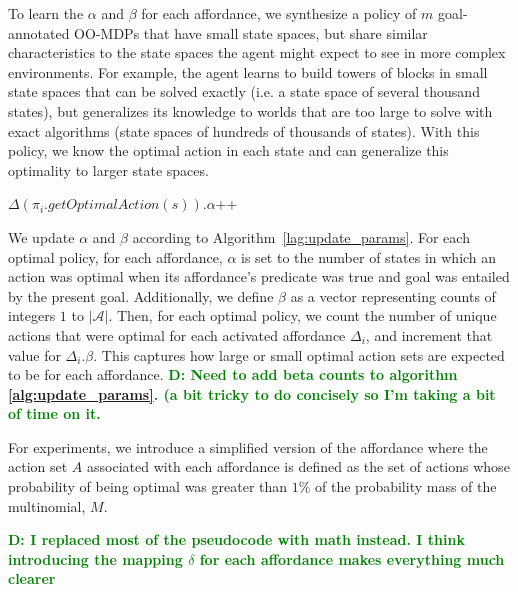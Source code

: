 \documentclass[conference]{IEEEtran}
\newcommand{\dnote}[1]{\textcolor{Green}{\textbf{D: #1}}}
\begin{document}
To learn the $\alpha$ and $\beta$ for each
affordance, we synthesize a policy of $m$ goal-annotated
OO-MDPs that have small state spaces, but share similar characteristics
to the state spaces the agent might expect to see in more
complex environments. For example, the agent learns to build towers
of blocks in small state spaces that can be solved exactly (i.e. a state space of several thousand states), but
generalizes its knowledge to worlds that are too large to
solve with exact algorithms (state spaces of hundreds of thousands of states). With this policy,
we know the optimal action in each state and can generalize this optimality to larger state spaces.

\begin{algorithm}
  \caption{$updateParameters(knowledgeBase, \pi)$}
  \begin{algorithmic}[1]
    \State $\Delta(\pi_i.getOptimalAction(s)).\alpha$++
    \EndIf
    \EndFor
    \EndFor
  \end{algorithmic}
  \label{alg:update_params}
\end{algorithm}

We update $\alpha$ and $\beta$ according to Algorithm~\ref{lag:update_params}.
For each optimal policy, for each affordance, $\alpha$ is set to the number of states in which an action was optimal
when its affordance's predicate was true and goal was entailed by the present goal.
Additionally, we define $\beta$ as a vector representing counts of
integers $1$ to $|\mathcal{A}|$. Then, for each optimal policy, we
count the number of unique actions that were optimal for each
activated affordance $\Delta_i$, and increment that value for
$\Delta_i.\beta$. This captures how large or small optimal action sets
are expected to be for each affordance. \dnote{Need to add beta 
counts to algorithm \ref{alg:update_params}. (a bit tricky to do concisely so I'm taking a bit of time on it.}

For experiments, we introduce a simplified version of the affordance where
the action set $A$ associated with each affordance is defined
as the set of actions whose probability of being optimal was greater than $1\%$
of the probability mass of the multinomial, $M$.

\dnote{I replaced most of the pseudocode with math instead. I think introducing the mapping $\delta$ for each affordance makes everything much clearer}
\end{document}
